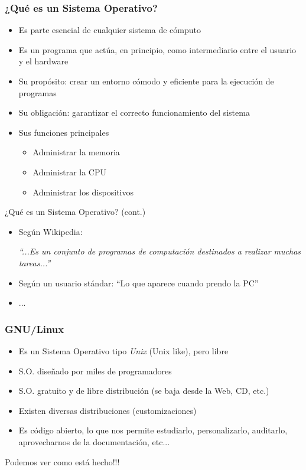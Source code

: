 \begin{frame}
  \frametitle{¿Qué es un Sistema Operativo?}
  \begin{itemize}
	  \item Es parte esencial de cualquier sistema de cómputo
	  \item Es un programa que actúa, en principio, como intermediario entre el usuario y el hardware
	  \item Su propósito: crear un entorno cómodo y eficiente para la ejecución de programas
	  \item Su obligación: garantizar el correcto funcionamiento del sistema
	  \item Sus funciones principales
		  \begin{itemize}
			  \item Administrar la memoria
			  \item Administrar la CPU
			  \item Administrar los dispositivos
		  \end{itemize}
  \end{itemize}
\end{frame}

\begin{frame}{¿Qué es un Sistema Operativo? (cont.)}
  \begin{itemize}
  \item Según Wikipedia:
  
   \textit{``...Es un conjunto de programas de computación destinados a realizar muchas tareas...''}
  \item Según un usuario stándar: ``Lo que aparece cuando prendo la PC''
  \item ...
  \end{itemize}
\end{frame}

\begin{frame}
	\frametitle{GNU/Linux}
	\begin{itemize}
		\item Es un Sistema Operativo tipo \textit{Unix} (Unix like), pero libre
		\item S.O. diseñado por miles de programadores
		\item S.O. gratuito y de libre distribución (se baja desde la Web, CD, etc.)
		\item Existen diversas distribuciones (customizaciones)
		\item \alert{Es código abierto}, lo que nos permite estudiarlo, personalizarlo, auditarlo, aprovecharnos de la documentación, etc...
	\end{itemize}
	\centerline{\alert{Podemos ver como está hecho!!!}}
\end{frame}

